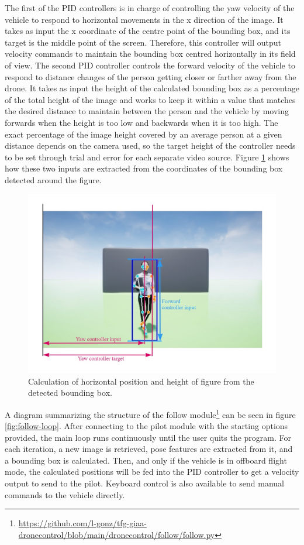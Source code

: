 The first of the PID controllers is in charge of controlling the yaw velocity of the vehicle to respond to horizontal movements in the x direction of the image.
It takes as input the x coordinate of the centre point of the bounding box, and its target is the middle point of the screen.
Therefore, this controller will output velocity commands to maintain the bounding box centred horizontally in its field of view.
The second PID controller controls the forward velocity of the vehicle to respond to distance changes of the person getting closer or farther away from the drone.
It takes as input the height of the calculated bounding box as a percentage of the total height of the image and works to keep it within a value that matches the desired distance to maintain between the person and the vehicle by moving forwards when the height is too low and backwards when it is too high.
The exact percentage of the image height covered by an average person at a given distance depends on the camera used, so the target height of the controller needs to be set through trial and error for each separate video source.
Figure \ref{fig:follow-input-calcs} shows how these two inputs are extracted from the coordinates of the bounding box detected around the figure.

\begin{figure}
  \centering
  \includegraphics[width=\textwidth, keepaspectratio]{img/pose-calculations.jpg}
  \caption{Calculation of horizontal position and height of figure from the detected bounding box.}
  \label{fig:follow-input-calcs}
\end{figure}


A diagram summarizing the structure of the follow module\footnote{\url{https://github.com/l-gonz/tfg-giaa-dronecontrol/blob/main/dronecontrol/follow/follow.py}} can be seen in figure \ref{fig:follow-loop}.
After connecting to the pilot module with the starting options provided, the main loop runs continuously until the user quits the program.
For each iteration, a new image is retrieved, pose features are extracted from it, and a bounding box is calculated.
Then, and only if the vehicle is in offboard flight mode, the calculated positions will be fed into the PID controller to get a velocity output to send to the pilot.
Keyboard control is also available to send manual commands to the vehicle directly.

